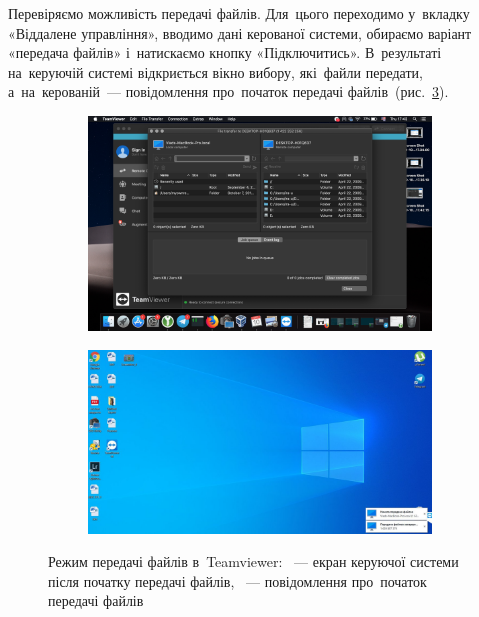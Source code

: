 \documentclass[
	a4paper,
	oneside,
	BCOR = 10mm,
	DIV = 12,
	12pt,
	headings = normal,
]{scrartcl}
\newlength{\gridunitwidth}
\begin{document}
			Перевіряємо можливість передачі файлів. Для~цього переходимо у~вкладку «Віддалене управління», вводимо дані керованої системи, обираємо варіант «передача файлів» і~натискаємо кнопку «Підключитись». В~результаті на~керуючій системі відкриється вікно вибору, які~файли передати, а~на~керованій~— повідомлення про~початок передачі файлів~(рис.~\ref{fig:03-teamviewer-file-transfer}).

			\begin{figure}[!htbp]
				\centering
				\begin{subfigure}[b]{8\gridunitwidth}
					\includegraphics[width = \columnwidth]{./assets/p03-04.png}
					\caption{}
					\label{subfig:03-teamviewer-file-transfer-01}
				\end{subfigure}
				\begin{subfigure}[b]{8\gridunitwidth}
					\includegraphics[width = \columnwidth]{./assets/p03-05.jpeg}
					\caption{}
					\label{subfig:03-teamviewer-file-transfer-02}
				\end{subfigure}
				\caption{Режим передачі файлів в~\textenglish{Teamviewer}: ~— екран керуючої системи після початку передачі файлів, ~— повідомлення про~початок передачі файлів}
				\label{fig:03-teamviewer-file-transfer}
			\end{figure}
\end{document}
